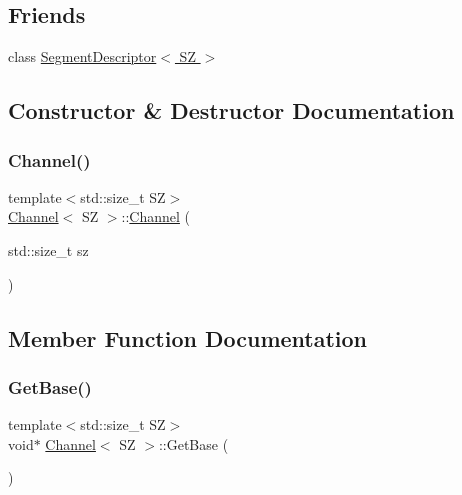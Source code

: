 \subsection*{Friends}
\begin{DoxyCompactItemize}
\item 
class \hyperlink{classChannel_aa9880fe41382d4118e3f013f9058746d}{Segment\+Descriptor$<$ S\+Z $>$}
\end{DoxyCompactItemize}


\subsection{Constructor \& Destructor Documentation}
\mbox{\label{classChannel_a5e18f101c74be5001d6b34a3026c6f7c}} 
\subsubsection{\texorpdfstring{Channel()}{Channel()}}
{\footnotesize\ttfamily template$<$std\+::size\+\_\+t SZ$>$ \\
\hyperlink{classChannel}{Channel}$<$ SZ $>$\+::\hyperlink{classChannel}{Channel} (\begin{DoxyParamCaption}\item[{std\+::size\+\_\+t}]{sz }\end{DoxyParamCaption})\hspace{0.3cm}{\ttfamily [inline]}}



\subsection{Member Function Documentation}
\mbox{\label{classChannel_a0bfa9c9c5280c8d3776c2e468f63586b}} 
\subsubsection{\texorpdfstring{Get\+Base()}{GetBase()}}
{\footnotesize\ttfamily template$<$std\+::size\+\_\+t SZ$>$ \\
void$\ast$ \hyperlink{classChannel}{Channel}$<$ SZ $>$\+::Get\+Base (\begin{DoxyParamCaption}{ }\end{DoxyParamCaption})\hspace{0.3cm}{\ttfamily [inline]}}



